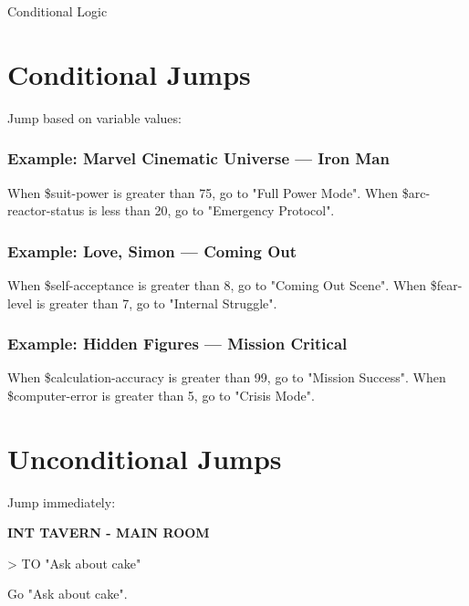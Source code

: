 \documentclass[11pt,letterpaper,oldstylefigures]{memoir}
\makeatletter
\newcommand{\slugline}[1]{\nobreak\textbf{\MakeUppercase{#1}}\par\nobreak\vspace{1\baselineskip}}
\newcommand{\stagedir}[1]{#1\par\vspace{1\baselineskip}}
\newenvironment{FountainExample}
  {\begingroup
  \ttfamily\small
   \setlength{\parindent}{0pt}
  \setlength{\parskip}{0.5em}
  \allowdisplaybreaks
  \setlength{\displaywidowpenalty}{0}
  \setlength{\widowpenalty}{0}
  \setlength{\clubpenalty}{0}
  \setlength{\interlinepenalty}{0}
}
  {\endgroup}
\let\oldchapter\chapter
\def\chapter{%
  \@ifstar
    {\FountainScripting@starchapter}%
    {\@dblarg\FountainScripting@chapter}}
\def\FountainScripting@starchapter#1{\oldchapter*{#1}\chaptermark{#1}}
\def\FountainScripting@chapter[#1]#2{\oldchapter[#1]{#2}\chaptermark{#2}}
\makeatother
\begin{document}
\chapter{Conditional Logic}
\label{ch:conditionals}

\section{Conditional Jumps}

Jump based on \gls{variable} values:

\subsubsection{Example: Marvel Cinematic Universe — Iron Man}

\begin{FountainExample}
\stagedir{When \$suit-power is greater than 75, go to "Full Power Mode". When \$arc-reactor-status is less than 20, go to "Emergency Protocol".}
\end{FountainExample}

\subsubsection{Example: Love, Simon — Coming Out}

\begin{FountainExample}
\stagedir{When \$self-acceptance is greater than 8, go to "Coming Out Scene". When \$fear-level is greater than 7, go to "Internal Struggle".}
\end{FountainExample}

\subsubsection{Example: Hidden Figures — Mission Critical}

\begin{FountainExample}
\stagedir{When \$calculation-accuracy is greater than 99, go to "Mission Success". When \$computer-error is greater than 5, go to "Crisis Mode".}
\end{FountainExample}

\section{Unconditional Jumps}

Jump immediately:

\begin{FountainExample}
\slugline{INT TAVERN - MAIN ROOM}

\stagedir{> TO "Ask about cake"}
\stagedir{Go "Ask about cake".}
\end{FountainExample}
\end{document}
